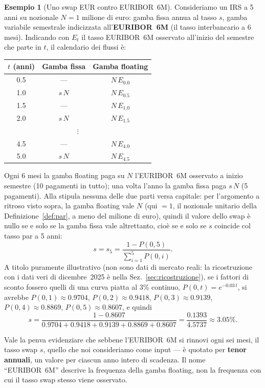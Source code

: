 \documentclass[11pt,a4paper]{article}
\theoremstyle{plain}
\theoremstyle{definition}
\newtheorem{esempio}[teorema]{Esempio}
\theoremstyle{remark}
\begin{document}
\begin{esempio}[Uno swap EUR contro EURIBOR~6M]
\label{ex:swap-euribor}
Consideriamo un IRS a 5 anni su nozionale $N=1$ milione di euro: gamba fissa annua al tasso
$s$, gamba variabile semestrale indicizzata all'\textbf{EURIBOR~6M} (il tasso interbancario a
6 mesi). Indicando con $E_{t}$ il tasso EURIBOR~6M osservato all'inizio del semestre che parte
in $t$, il calendario dei flussi \`e:
\begin{center}\small
\begin{tabular}{ccc}
\toprule
$t$ (anni) & Gamba fissa & Gamba floating \\
\midrule
0.5 & --- & $N\,E_{0.0}$ \\
1.0 & $s\,N$ & $N\,E_{0.5}$ \\
1.5 & --- & $N\,E_{1.0}$ \\
2.0 & $s\,N$ & $N\,E_{1.5}$ \\
\multicolumn{3}{c}{$\vdots$} \\
4.5 & --- & $N\,E_{4.0}$ \\
5.0 & $s\,N$ & $N\,E_{4.5}$ \\
\bottomrule
\end{tabular}
\end{center}
Ogni 6 mesi la gamba floating paga su $N$ l'EURIBOR~6M osservato a inizio semestre (10
pagamenti in tutto); una volta l'anno la gamba fissa paga $s\,N$ (5 pagamenti). Alla stipula
nessuna delle due parti versa capitale: per l'argomento a ritroso visto sopra, la gamba
floating vale $N$ (qui $=1$, il nozionale unitario della Definizione~\ref{def:par}, a meno del
milione di euro), quindi il valore dello swap \`e nullo se e solo se la gamba fissa vale
altrettanto, cio\`e se e solo se $s$ coincide col tasso par a 5 anni:
\[
  s = s_5 = \frac{1-P(0,5)}{\displaystyle\sum_{i=1}^{5} P(0,i)}.
\]
A titolo puramente illustrativo (non sono dati di mercato reali: la ricostruzione con i dati
veri di dicembre~2025 \`e nella Sez.~\ref{sec:ricostruzione}), se i fattori di sconto fossero
quelli di una curva piatta al 3\% continuo, $P(0,t)=e^{-0.03\,t}$, si avrebbe $P(0,1)\approx
0.9704$, $P(0,2)\approx 0.9418$, $P(0,3)\approx 0.9139$, $P(0,4)\approx 0.8869$,
$P(0,5)\approx 0.8607$, e quindi
\[
  s = \frac{1-0.8607}{0.9704+0.9418+0.9139+0.8869+0.8607} = \frac{0.1393}{4.5737} \approx 3.05\%.
\]
\end{esempio}

Vale la penva evidenziare che sebbene l'EURIBOR~6M si rinnovi ogni sei mesi, il tasso swap $s$, quello che noi 
consideriamo come input --- \`e quotato per \textbf{tenor
annuali}, un valore per ciascun anno intero di scadenza. Il nome
``EURIBOR~6M'' descrive la frequenza della gamba floating, non la frequenza con cui il tasso
swap stesso viene osservato.
\end{document}
